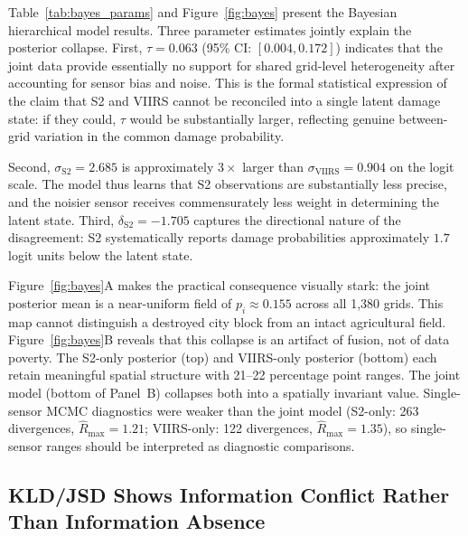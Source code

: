 \documentclass[wcp]{jmlr}
\begin{document}
Table~\ref{tab:bayes_params} and Figure~\ref{fig:bayes} present the
Bayesian hierarchical model results. Three parameter estimates jointly
explain the posterior collapse. First, $\tau = 0.063$ (95\% CI: $[0.004,
0.172]$) indicates that the joint data provide essentially no support for
shared grid-level heterogeneity after accounting for sensor bias and noise.
This is the formal statistical expression of the claim that S2 and VIIRS
cannot be reconciled into a single latent damage state: if they could,
$\tau$ would be substantially larger, reflecting genuine between-grid
variation in the common damage probability.

Second, $\sigma_{\text{S2}} = 2.685$ is approximately $3\times$ larger
than $\sigma_{\text{VIIRS}} = 0.904$ on the logit scale. The model thus
learns that S2 observations are substantially less precise, and the noisier
sensor receives commensurately less weight in determining the latent state.
Third, $\delta_{\text{S2}} = -1.705$ captures the directional nature of the
disagreement: S2 systematically reports damage probabilities approximately
$1.7$ logit units below the latent state.

Figure~\ref{fig:bayes}A makes the practical consequence visually stark: the
joint posterior mean is a near-uniform field of $p_i \approx 0.155$ across
all 1{,}380 grids. This map cannot distinguish a destroyed city block from
an intact agricultural field. Figure~\ref{fig:bayes}B reveals that this
collapse is an artifact of fusion, not of data poverty. The S2-only
posterior (top) and VIIRS-only posterior (bottom) each retain meaningful
spatial structure with 21--22 percentage point ranges. The joint model
(bottom of Panel~B) collapses both into a spatially invariant value.
Single-sensor MCMC diagnostics were weaker than the joint model (S2-only:
263 divergences, $\hat{R}_{\max}=1.21$; VIIRS-only: 122 divergences,
$\hat{R}_{\max}=1.35$), so single-sensor ranges should be interpreted as
diagnostic comparisons.

\subsection{KLD/JSD Shows Information Conflict Rather Than Information
Absence}\label{sec:res-kld}
\end{document}
